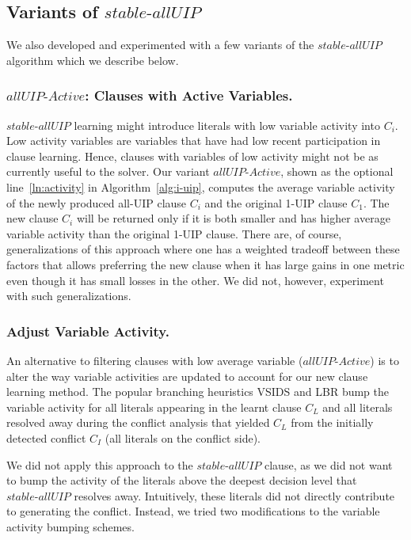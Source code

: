 \documentclass[runningheads]{llncs}
\newcommand{\allUip}{\textit{stable-allUIP}}
\newcommand{\allUipAct}{\textit{allUIP-Active}}
\begin{document}
\subsection{Variants of $\allUip$}
We also developed and experimented with a few variants of the
$\allUip$ algorithm which we describe below.

\subsubsection{$\allUipAct$: Clauses with Active
  Variables.} \label{sec:active} $\allUip$ learning might introduce
literals with low variable activity into $C_i$. Low activity variables
are variables that have had low recent participation in clause
learning. Hence, clauses with variables of low activity might not be
as currently useful to the solver. Our variant $\allUipAct$, shown as
the optional line~\ref{ln:activity} in Algorithm~\ref{alg:i-uip},
computes the average variable activity of the newly produced all-UIP
clause $C_i$ and the original 1-UIP clause $C_1$. The new clause $C_i$
will be returned only if it is both smaller and has higher average
variable activity than the original 1-UIP clause. There are, of
course, generalizations of this approach where one has a weighted
tradeoff between these factors that allows preferring the new clause
when it has large gains in one metric even though it has small losses
in the other. We did not, however, experiment with such
generalizations.

\subsubsection{Adjust Variable Activity.} \label{sec: varajust} An
alternative to filtering clauses with low average variable
($\allUipAct$) is to alter the way variable activities are updated to
account for our new clause learning method. The popular branching
heuristics VSIDS \cite{DBLP:conf/dac/MoskewiczMZZM01} and LBR
\cite{DBLP:conf/sat/LiangGPC16} bump the variable activity for all
literals appearing in the learnt clause $C_L$ and all literals
resolved away during the conflict analysis that yielded $C_L$ from the
initially detected conflict $C_I$ (all literals on the conflict side).

We did not apply this approach to the $\allUip$ clause, as we did not
want to bump the activity of the literals above the deepest decision
level that $\allUip$ resolves away. Intuitively, these literals did
not directly contribute to generating the conflict. Instead, we tried
two modifications to the variable activity bumping schemes.
\end{document}
